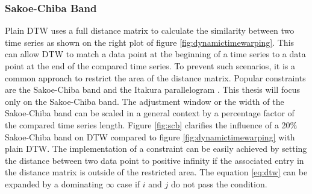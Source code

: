 \subsubsection{Sakoe-Chiba Band} \label{sakoe-chiba_band}
Plain DTW uses a full distance matrix to calculate the similarity between two time series as shown on the right plot of
figure \ref{fig:dynamictimewarping}. This can allow DTW to match a data point at the beginning of a time series to a
data point at the end of the compared time series. To prevent such scenarios, it is a common approach to restrict the
area of the distance matrix. Popular constraints are the Sakoe-Chiba band \cite{sakoe1978dynamic} and the Itakura
parallelogram \cite{itakura1975minimum}. This thesis will focus only on the Sakoe-Chiba band. The adjustment window or
the width of the Sakoe-Chiba band can be scaled in a general context by a percentage factor of the compared time series
length. Figure \ref{fig:scb} clarifies the influence of a 20\% Sakoe-Chiba band on DTW compared to figure
\ref{fig:dynamictimewarping} with plain DTW. The implementation of a constraint can be easily achieved by setting the
distance between two data point to positive infinity if the associated entry in the distance matrix is outside of the
restricted area. The equation \ref{eq:dtw} can be expanded by a dominating $\infty$ case if $i$ and $j$ do not pass the
condition.

